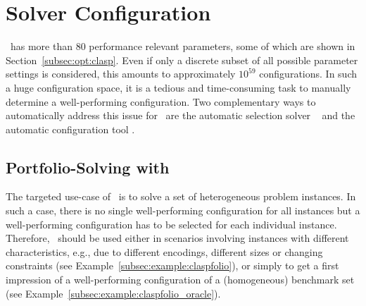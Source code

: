 
\section{Solver Configuration}
\label{sec:configuration}

\clasp\ has more than $80$ performance relevant parameters, some of which are shown in Section~\ref{subsec:opt:clasp}.
Even if only a discrete subset of all possible parameter settings is considered,
this amounts to approximately $10^{59}$ configurations.
In such a huge configuration space, 
it is a tedious and time-consuming task 
to manually determine a well-performing configuration.
Two complementary ways to automatically address this issue for \clasp\ are 
the automatic  selection solver \claspfolio~\cite{holisc14a} and 
the automatic  configuration tool \piclasp.%

\subsection{Portfolio-Solving with \claspfolio}
\label{sec:claspfolio}

The targeted use-case of \claspfolio\ is to solve a set of heterogeneous problem instances.
In such a case,
there is no single well-performing configuration for all instances
but a well-performing configuration has to be selected for each individual instance.
Therefore, \claspfolio\ should be used either 
in scenarios involving instances with different characteristics, 
e.g., due to different encodings, different sizes or changing constraints 
(see Example~\ref{subsec:example:claspfolio}),
or 
simply to get a first impression of a well-performing configuration of a (homogeneous) benchmark set (see Example~\ref{subsec:example:claspfolio_oracle}). 

